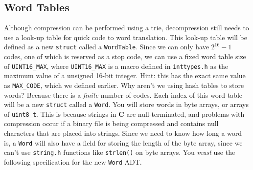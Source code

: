 \documentclass{article}
\begin{document}
\subsection{Word Tables}

Although compression can be performed using a trie, decompression still needs to
use a look-up table for quick code to word translation. This look-up table will
be defined as a new \texttt{struct} called a \texttt{WordTable}. Since we can
only have $2^{16}-1$ codes, one of which is reserved as a stop code, we can use
a fixed word table size of \texttt{UINT16\_MAX}, where \texttt{UINT16\_MAX} is a
macro defined in \texttt{inttypes.h} as the maximum value of a unsigned 16-bit
integer. Hint: this has the exact same value as \texttt{MAX\_CODE}, which we
defined earlier.  Why aren't we using hash tables to store words? Because there
is a \emph{finite} number of codes. Each index of this word table will be a new
\texttt{struct} called a \texttt{Word}. You will store words in byte arrays, or
arrays of \texttt{uint8\_t}. This is because strings in \textbf{C} are
null-terminated, and problems with compression occur if a binary file is being
compressed and contains null characters that are placed into strings.  Since we
need to know how long a word is, a \texttt{Word} will also have a field for
storing the length of the byte array, since we can't use \texttt{string.h}
functions like \texttt{strlen()} on byte arrays. You \emph {must} use the
following specification for the new \texttt{Word} ADT.
\end{document}
